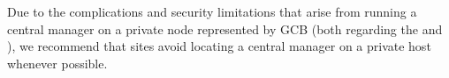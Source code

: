 Due to the complications and security limitations that arise from
running a central manager on a private node represented by GCB (both
regarding the  and
), we
recommend that sites avoid locating a central manager on a private
host whenever possible.

